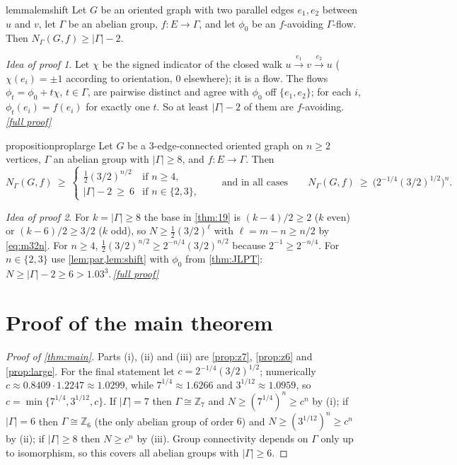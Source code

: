 \documentclass[11pt,a4paper]{article}
\theoremstyle{plain}
\theoremstyle{definition}
\theoremstyle{remark}
\newtheorem*{proofidea}{Idea of proof}
\newcommand{\fullproofref}[1]{\,\hyperref[#1]{\textit{[full proof]}}}
\newcommand{\Z}{{\mathbb Z}}
\newcommand{\Nf}{N}
\begin{document}
\begin{restatable}{lemma}{lemshift}\label{lem:shift}
Let $G$ be an oriented graph with two parallel edges $e_1,e_2$ between $u$ and $v$, let $\Gamma$ be an abelian group, $f\colon E\to\Gamma$, and let $\phi_0$ be an $f$-avoiding $\Gamma$-flow. Then $\Nf_\Gamma(G,f)\ge|\Gamma|-2$.
\end{restatable}
\begin{proofidea}
Let $\chi$ be the signed indicator of the closed walk $u\xrightarrow{e_1}v\xrightarrow{e_2}u$ ($\chi(e_i)=\pm1$ according to orientation, $0$ elsewhere); it is a flow. The flows $\phi_t=\phi_0+t\chi$, $t\in\Gamma$, are pairwise distinct and agree with $\phi_0$ off $\{e_1,e_2\}$; for each $i$, $\phi_t(e_i)=f(e_i)$ for exactly one $t$. So at least $|\Gamma|-2$ of them are $f$-avoiding.\fullproofref{pf:shift}
\end{proofidea}

\begin{restatable}{proposition}{proplarge}\label{prop:large}
Let $G$ be a $3$-edge-connected oriented graph on $n\ge2$ vertices, $\Gamma$ an abelian group with $|\Gamma|\ge8$, and $f\colon E\to\Gamma$. Then
\[
 \Nf_\Gamma(G,f)\ \ge\ \begin{cases}\tfrac12(3/2)^{n/2} & \text{if } n\ge4,\\ |\Gamma|-2\ \ge\ 6 & \text{if } n\in\{2,3\},\end{cases}
\qquad\text{and in all cases}\qquad \Nf_\Gamma(G,f)\ \ge\ \bigl(2^{-1/4}(3/2)^{1/2}\bigr)^{n}.
\]
\end{restatable}
\begin{proofidea}
For $k=|\Gamma|\ge8$ the base in \cref{thm:19} is $(k-4)/2\ge2$ ($k$ even) or $(k-6)/2\ge3/2$ ($k$ odd), so $\Nf\ge\frac12(3/2)^{\ell}$ with $\ell=m-n\ge n/2$ by \eqref{eq:m32n}. For $n\ge4$, $\frac12(3/2)^{n/2}\ge2^{-n/4}(3/2)^{n/2}$ because $2^{-1}\ge2^{-n/4}$. For $n\in\{2,3\}$ use \cref{lem:par,lem:shift} with $\phi_0$ from \cref{thm:JLPT}: $\Nf\ge|\Gamma|-2\ge6>1.03^{3}$.\fullproofref{pf:large}
\end{proofidea}

\section{Proof of the main theorem}\label{sec:proof}

\begin{proof}[Proof of \cref{thm:main}]
Parts (i), (ii) and (iii) are \cref{prop:z7}, \cref{prop:z6} and \cref{prop:large}. For the final statement let $c=2^{-1/4}(3/2)^{1/2}$; numerically $c\approx0.8409\cdot1.2247\approx1.0299$, while $7^{1/4}\approx1.6266$ and $3^{1/12}\approx1.0959$, so $c=\min\{7^{1/4},3^{1/12},c\}$. If $|\Gamma|=7$ then $\Gamma\cong\Z_7$ and $\Nf\ge(7^{1/4})^n\ge c^n$ by (i); if $|\Gamma|=6$ then $\Gamma\cong\Z_6$ (the only abelian group of order $6$) and $\Nf\ge(3^{1/12})^n\ge c^n$ by (ii); if $|\Gamma|\ge8$ then $\Nf\ge c^n$ by (iii). Group connectivity depends on $\Gamma$ only up to isomorphism, so this covers all abelian groups with $|\Gamma|\ge6$.
\end{proof}
\end{document}
